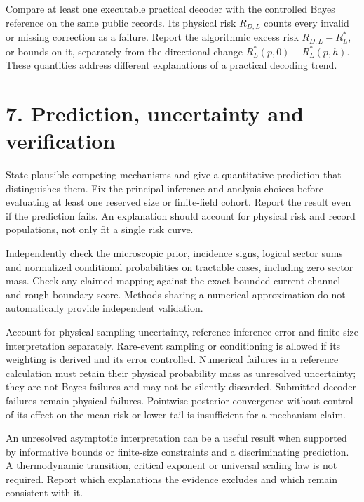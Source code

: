 \documentclass[11pt,letterpaper]{article}
\begin{document}
Compare at least one executable practical decoder with the controlled Bayes reference on the same public records. Its physical risk $R_{D,L}$ counts every invalid or missing correction as a failure. Report the algorithmic excess risk $R_{D,L}-R_L^*$, or bounds on it, separately from the directional change $R_L^*(p,0)-R_L^*(p,h)$. These quantities address different explanations of a practical decoding trend.\par

\section*{7. Prediction, uncertainty and verification}

State plausible competing mechanisms and give a quantitative prediction that distinguishes them. Fix the principal inference and analysis choices before evaluating at least one reserved size or finite-field cohort. Report the result even if the prediction fails. An explanation should account for physical risk and record populations, not only fit a single risk curve.\par

Independently check the microscopic prior, incidence signs, logical sector sums and normalized conditional probabilities on tractable cases, including zero sector mass. Check any claimed mapping against the exact bounded-current channel and rough-boundary score. Methods sharing a numerical approximation do not automatically provide independent validation.\par

Account for physical sampling uncertainty, reference-inference error and finite-size interpretation separately. Rare-event sampling or conditioning is allowed if its weighting is derived and its error controlled. Numerical failures in a reference calculation must retain their physical probability mass as unresolved uncertainty; they are not Bayes failures and may not be silently discarded. Submitted decoder failures remain physical failures. Pointwise posterior convergence without control of its effect on the mean risk or lower tail is insufficient for a mechanism claim.\par

An unresolved asymptotic interpretation can be a useful result when supported by informative bounds or finite-size constraints and a discriminating prediction. A thermodynamic transition, critical exponent or universal scaling law is not required. Report which explanations the evidence excludes and which remain consistent with it.\par
\end{document}
